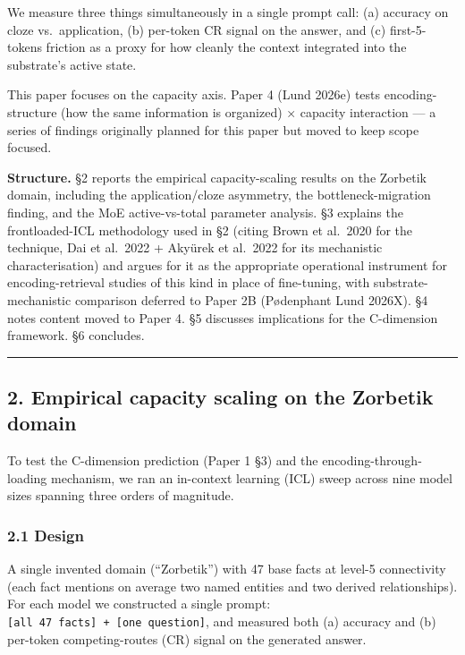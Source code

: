 \documentclass[
]{article}
\begin{document}
We measure three things simultaneously in a single prompt call: (a)
accuracy on cloze vs.~application, (b) per-token CR signal on the
answer, and (c) first-5-tokens friction as a proxy for how cleanly the
context integrated into the substrate's active state.

This paper focuses on the capacity axis. Paper 4 (Lund 2026e) tests
encoding-structure (how the same information is organized) × capacity
interaction --- a series of findings originally planned for this paper
but moved to keep scope focused.

\textbf{Structure.} §2 reports the empirical capacity-scaling results on
the Zorbetik domain, including the application/cloze asymmetry, the
bottleneck-migration finding, and the MoE active-vs-total parameter
analysis. §3 explains the frontloaded-ICL methodology used in §2 (citing
Brown et al.~2020 for the technique, Dai et al.~2022 + Akyürek et
al.~2022 for its mechanistic characterisation) and argues for it as the
appropriate operational instrument for encoding-retrieval studies of
this kind in place of fine-tuning, with substrate-mechanistic comparison
deferred to Paper 2B (Pødenphant Lund 2026X). §4 notes content moved to
Paper 4. §5 discusses implications for the C-dimension framework. §6
concludes.

\begin{center}\rule{0.5\linewidth}{0.5pt}\end{center}

\subsection{2. Empirical capacity scaling on the Zorbetik
domain}\label{empirical-capacity-scaling-on-the-zorbetik-domain}

To test the C-dimension prediction (Paper 1 §3) and the
encoding-through-loading mechanism, we ran an in-context learning (ICL)
sweep across nine model sizes spanning three orders of magnitude.

\subsubsection{2.1 Design}\label{design}

A single invented domain (``Zorbetik'') with 47 base facts at level-5
connectivity (each fact mentions on average two named entities and two
derived relationships). For each model we constructed a single prompt:
\texttt{{[}all\ 47\ facts{]}\ +\ {[}one\ question{]}}, and measured both
(a) accuracy and (b) per-token competing-routes (CR) signal on the
generated answer.
\end{document}
